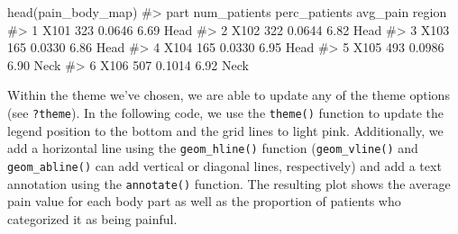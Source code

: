 \documentclass[
  letterpaper,
]{latex/krantz}
\makeatletter
\newenvironment{Shaded}{\begin{snugshade}}{\end{snugshade}}
\newcommand{\CommentTok}[1]{\textcolor[rgb]{0.37,0.37,0.37}{#1}}
\newcommand{\FunctionTok}[1]{\textcolor[rgb]{0.28,0.35,0.67}{#1}}
\newcommand{\NormalTok}[1]{\textcolor[rgb]{0.00,0.23,0.31}{#1}}
\newenvironment{kframe}{%
\medskip{}
\setlength{\fboxsep}{.8em}
 \def\at@end@of@kframe{}%
 \ifinner\ifhmode%
  \def\at@end@of@kframe{\end{minipage}}%
  \begin{minipage}{\columnwidth}%
 \fi\fi%
 \def\FrameCommand##1{\hskip\@totalleftmargin \hskip-\fboxsep
 \colorbox{shadecolor}{##1}\hskip-\fboxsep
     \hskip-\linewidth \hskip-\@totalleftmargin \hskip\columnwidth}%
 \MakeFramed {\advance\hsize-\width
   \@totalleftmargin\z@ \linewidth\hsize
   \@setminipage}}%
 {\par\unskip\endMakeFramed%
 \at@end@of@kframe}
\renewenvironment{Shaded}{\begin{kframe}}{\end{kframe}}
\makeatother
\begin{document}
\begin{Shaded}
\begin{Highlighting}[]
\FunctionTok{head}\NormalTok{(pain\_body\_map)}
\CommentTok{\#\textgreater{}   part num\_patients perc\_patients avg\_pain region}
\CommentTok{\#\textgreater{} 1 X101          323        0.0646     6.69   Head}
\CommentTok{\#\textgreater{} 2 X102          322        0.0644     6.82   Head}
\CommentTok{\#\textgreater{} 3 X103          165        0.0330     6.86   Head}
\CommentTok{\#\textgreater{} 4 X104          165        0.0330     6.95   Head}
\CommentTok{\#\textgreater{} 5 X105          493        0.0986     6.90   Neck}
\CommentTok{\#\textgreater{} 6 X106          507        0.1014     6.92   Neck}
\end{Highlighting}
\end{Shaded}

Within the theme we've chosen, we are able to update any of the theme
options (see \texttt{?theme}). In the following code, we use the
\texttt{theme()} function
 to update the legend position to the bottom and
the grid lines to light pink. Additionally, we add a horizontal line
using the
\texttt{geom\_hline()}
function
(\texttt{geom\_vline()}
and
\texttt{geom\_abline()}
can add vertical or diagonal lines, respectively) and add a text
annotation using the
\texttt{annotate()}
function. The resulting plot shows the average pain value for each body
part as well as the proportion of patients who categorized it as being
painful.
\end{document}
